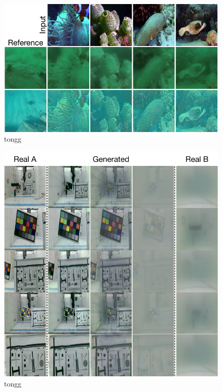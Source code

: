 \begin{figure}[ht]
    \centering
	\includegraphics[width=\textwidth]{figures/RUIE_guidance.pdf}
	\caption{tongg}
	\label{fig:ruie_guide}
\end{figure}

\begin{figure}[ht]
    \centering
	\includegraphics[width=\textwidth]{figures/UVB-change.pdf}
	\caption{tongg}
	\label{fig:uvb-change}
\end{figure}

